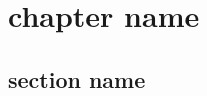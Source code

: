 \documentclass[../../master.tex]{subfiles}
\begin{document}
\chapter{chapter name}
\section{section name}
\end{document}
